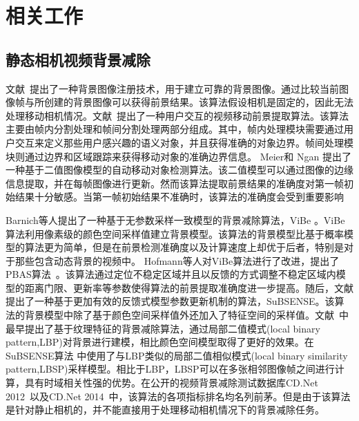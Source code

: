  \section{相关工作}
 \label{ch4:sec:relatedWorks}

 \subsection{静态相机视频背景减除}
 \label{ch4:sec:sub:scbs}

 文献~提出了一种背景图像注册技术，用于建立可靠的背景图像。通过比较当前图像帧与所创建的背景图像可以获得前景结果。该算法假设相机是固定的，因此无法处理移动相机情况。文献~提出了一种用户交互的视频移动前景提取算法。该算法主要由帧内分割处理和帧间分割处理两部分组成。其中，帧内处理模块需要通过用户交互来定义那些用户感兴趣的语义对象，并且获得准确的对象边界。帧间处理模块则通过边界和区域跟踪来获得移动对象的准确边界信息。 Meier和 Ngan\cite{Meier1998Automatic} 提出了一种基于二值图像模型的自动移动对象检测算法。该二值模型可以通过图像的边缘信息提取，并在每帧图像进行更新。然而该算法提取前景结果的准确度对第一帧初始结果十分敏感。当第一帧初始结果不准确时，该算法的准确度会受到重要影响 \par
Barnich等人提出了一种基于无参数采样一致模型的背景减除算法，ViBe \cite{Barnich2011ViBe}。ViBe算法利用像素级的颜色空间采样值建立背景模型。该算法的背景模型比基于概率模型的算法\cite{GMMPAMI}更为简单，但是在前景检测准确度以及计算速度上却优于后者，特别是对于那些包含动态背景的视频中。 Hofmann等人对ViBe算法进行了改进，提出了PBAS算法~\cite{pbas}。该算法通过定位不稳定区域并且以反馈的方式调整不稳定区域内模型的距离门限、更新率等参数使得算法的前景提取准确度进一步提高。随后，文献 提出了一种基于更加有效的反馈式模型参数更新机制的算法，SuBSENSE。该算法的背景模型中除了基于颜色空间采样值外还加入了特征空间的采样值。文献~中最早提出了基于纹理特征的背景减除算法，通过局部二值模式(local binary pattern,LBP)对背景进行建模，相比颜色空间模型取得了更好的效果。在SuBSENSE算法 \cite{subsenseTIP}中使用了与LBP类似的局部二值相似模式(local binary similarity pattern,LBSP)采样模型。相比于LBP，LBSP可以在多张相邻图像帧之间进行计算，具有时域相关性强的优势。在公开的视频背景减除测试数据库CD.Net 2012~\cite{CDNet2012}以及CD.Net 2014~\cite{CD2014}中，该算法的各项指标排名均名列前茅。但是由于该算法是针对静止相机的，并不能直接用于处理移动相机情况下的背景减除任务。\par


